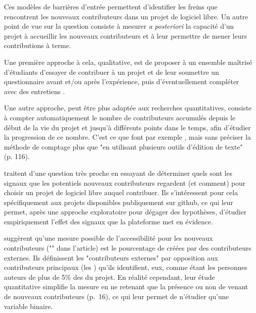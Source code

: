 Ces modèles de barrières d'entrée permettent d'identifier les freins que rencontrent les nouveaux
contributeurs dans un projet de logiciel libre. Un autre point de vue sur la question consiste à mesurer
\emph{a posteriori} la capacité d'un projet à accueillir les nouveaux contributeurs et à leur permettre de
mener leurs contributions à terme.

Une première approche à cela, qualitative, est de proposer à un ensemble maîtrisé d'étudiants d'essayer de
contribuer à un projet et de leur soumettre un questionnaire avant et/ou après l'expérience, puis
d'éventuellement compléter avec des entretiens
\parencites{newcomers-accessibility-2016}{newcomers-onboarding-2018}[voir aussi][]{newcomers-adaptation-2005}.

Une autre approche, peut être plus adaptée aux recherches quantitatives, consiste à compter automatiquement le
nombre de contributeurs accumulés depuis le début de la vie du projet et jusqu'à différents points dans le
temps, afin d'étudier la progression de ce nombre. C'est ce que font par exemple
, mais sans préciser la méthode de comptage plus que "en utilisant
plusieurs outils d'édition de texte" (p. 116).

 traitent d'une question très proche en essayant de déterminer quels sont les
signaux que les potentiels nouveaux contributeurs regardent (et comment) pour choisir un projet de logiciel
libre auquel contribuer. Ils s'intéressent pour cela spécifiquement aux projets disponibles publiquement sur
\gls{github}, ce qui leur permet, après une approche exploratoire pour dégager des hypothèses, d'étudier
empiriquement l'effet des signaux que la plateforme met en évidence.

 suggèrent qu'une mesure possible de l'accessibilité pour les nouveaux
contributeurs ("" dans l'article) est le pourcentage de  créées
par des contributeurs externes. Ils définissent les "contributeurs externes" par opposition aux contributeurs
principaux (les ) qu'ils identifient, eux, comme étant les personnes auteurs de plus de
5\% des  du projet. En réalité cependant, leur étude quantitative simplifie la mesure en ne
retenant que la présence ou non de  venant de nouveaux contributeurs (p.~16), ce qui leur
permet de n'étudier qu'une variable binaire.


